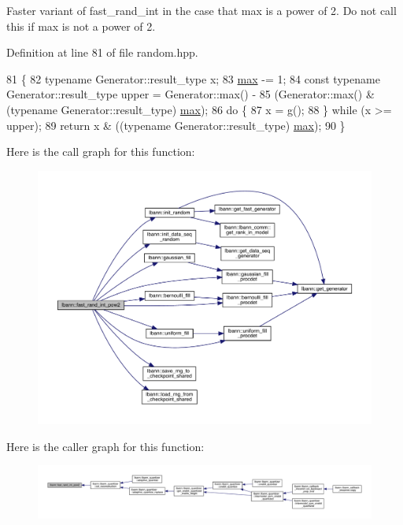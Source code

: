 Faster variant of fast\+\_\+rand\+\_\+int in the case that max is a power of 2. Do not call this if max is not a power of 2. 

Definition at line 81 of file random.\+hpp.


\begin{DoxyCode}
81                                                  \{
82   \textcolor{keyword}{typename} Generator::result\_type x;
83   \hyperlink{base_8hpp_ac47a6ee5278a53898222a48639a2bf39a2ffe4e77325d9a7152f7086ea7aa5114}{max} -= 1;
84   \textcolor{keyword}{const} \textcolor{keyword}{typename} Generator::result\_type upper = Generator::max() -
85       (Generator::max() & (\textcolor{keyword}{typename} Generator::result\_type) \hyperlink{base_8hpp_ac47a6ee5278a53898222a48639a2bf39a2ffe4e77325d9a7152f7086ea7aa5114}{max});
86   \textcolor{keywordflow}{do} \{
87     x = g();
88   \} \textcolor{keywordflow}{while} (x >= upper);
89   \textcolor{keywordflow}{return} x & ((\textcolor{keyword}{typename} Generator::result\_type) \hyperlink{base_8hpp_ac47a6ee5278a53898222a48639a2bf39a2ffe4e77325d9a7152f7086ea7aa5114}{max});
90 \}
\end{DoxyCode}
Here is the call graph for this function\+:\nopagebreak
\begin{figure}[H]
\begin{center}
\leavevmode
\includegraphics[width=350pt]{namespacelbann_a2fe8cea17a147566b73260f557b51006_cgraph}
\end{center}
\end{figure}
Here is the caller graph for this function\+:\nopagebreak
\begin{figure}[H]
\begin{center}
\leavevmode
\includegraphics[width=350pt]{namespacelbann_a2fe8cea17a147566b73260f557b51006_icgraph}
\end{center}
\end{figure}
\mbox{\label{namespacelbann_a99724ee5a6647a1d8bff6764b9aa5fac}} 
